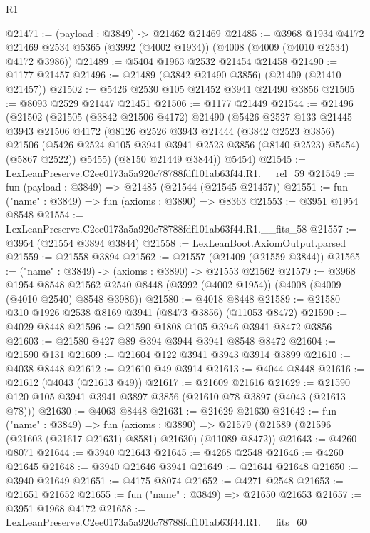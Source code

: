 \begin{lexlean}{R1}
\begin{coremodule}
@21471 := (payload : @3849) -> @21462 @21469
@21485 := @3968
    @1934
    @4172
    @21469
    @2534
    @5365
    (@3992 (@4002 @1934))
    (@4008 (@4009 (@4010 @2534) @4172 @3986))
@21489 := @5404 @1963 @2532 @21454 @21458
@21490 := @1177 @21457
@21496 := @21489 (@3842 @21490 @3856) (@21409 (@21410 @21457))
@21502 := @5426 @2530 @105 @21452 @3941 @21490 @3856
@21505 := @8093 @2529 @21447 @21451
@21506 := @1177 @21449
@21544 := @21496
    (@21502
      (@21505
        (@3842 @21506 @4172)
        @21490
        (@5426
          @2527
          @133
          @21445
          @3943
          @21506
          @4172
          (@8126
            @2526
            @3943
            @21444
            (@3842 @2523 @3856)
            @21506
            (@5426 @2524 @105 @3941 @3941 @2523 @3856 (@8140 @2523) @5454)
            (@5867 @2522))
          @5455)
        (@8150 @21449 @3844))
      @5454)
@21545 := LexLeanPreserve.C2ee0173a5a920c78788fdf101ab63f44.R1.__rel_59
@21549 := fun (payload : @3849) => @21485 (@21544 (@21545 @21457))
@21551 := fun ("name" : @3849) => fun (axioms : @3890) => @8363
@21553 := @3951 @1954 @8548
@21554 := LexLeanPreserve.C2ee0173a5a920c78788fdf101ab63f44.R1.__fits_58
@21557 := @3954 (@21554 @3894 @3844)
@21558 := LexLeanBoot.AxiomOutput.parsed
@21559 := @21558 @3894
@21562 := @21557 (@21409 (@21559 @3844))
@21565 := ("name" : @3849) -> (axioms : @3890) -> @21553 @21562
@21579 := @3968
    @1954
    @8548
    @21562
    @2540
    @8448
    (@3992 (@4002 @1954))
    (@4008 (@4009 (@4010 @2540) @8548 @3986))
@21580 := @4018 @8448
@21589 := @21580 @310 @1926 @2538 @8169 @3941 (@8473 @3856) (@11053 @8472)
@21590 := @4029 @8448
@21596 := @21590 @1808 @105 @3946 @3941 @8472 @3856
@21603 := @21580 @427 @89 @394 @3944 @3941 @8548 @8472
@21604 := @21590 @131
@21609 := @21604 @122 @3941 @3943 @3914 @3899
@21610 := @4038 @8448
@21612 := @21610 @49 @3914
@21613 := @4044 @8448
@21616 := @21612 (@4043 (@21613 @49))
@21617 := @21609 @21616
@21629 := @21590 @120 @105 @3941 @3941 @3897 @3856 (@21610 @78 @3897 (@4043 (@21613 @78)))
@21630 := @4063 @8448
@21631 := @21629 @21630
@21642 := fun ("name" : @3849) =>
  fun (axioms : @3890) =>
  @21579 (@21589 (@21596 (@21603 (@21617 @21631) @8581) @21630) (@11089 @8472))
@21643 := @4260 @8071
@21644 := @3940 @21643
@21645 := @4268 @2548
@21646 := @4260 @21645
@21648 := @3940 @21646 @3941
@21649 := @21644 @21648
@21650 := @3940 @21649
@21651 := @4175 @8074
@21652 := @4271 @2548
@21653 := @21651 @21652
@21655 := fun ("name" : @3849) => @21650 @21653
@21657 := @3951 @1968 @4172
@21658 := LexLeanPreserve.C2ee0173a5a920c78788fdf101ab63f44.R1.__fits_60

\end{coremodule}
\end{lexlean}
